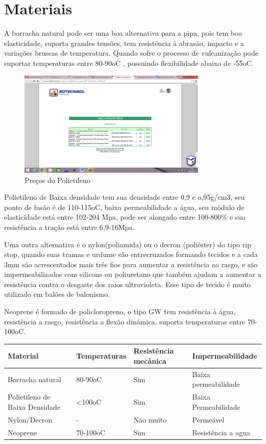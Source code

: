 \section{Materiais}

A borracha natural pode ser uma boa alternativa para a pipa, pois tem boa elasticidade, suporta grandes tensões, tem  resistência à abrasão, impacto e a variações bruscas de temperatura. Quando sofre o processo de vulcanização pode suportar temperaturas entre 80-90oC , possuindo flexibilidade abaixo de -55oC.

\begin{figure}[p]
    \includegraphics[width=0.8\textwidth]{figuras/preco-polietileno.png}
    \caption{Preços do Polietileno}
    \label{fig:polietileno}
\end{figure} 

Polietileno de Baixa densidade tem sua densidade entre 0,9 e o,95g/cm3, seu ponto de fusão é de 110-115oC, baixa permeabilidade a água, seu módulo de elasticidade está entre 102-204 Mpa, pode ser alongado entre 100-800\% e sua resistência a tração está entre 6,9-16Mpa.

Uma outra alternativa é o nylon(poliamida) ou o decron (poliéster) do tipo rip stop, quando suas tramas e urdume são entrecruzados formando tecidos e a cada 3mm são acrescentados mais três fios para aumentar a resistência ao rasgo, e são impermeabilizados com silicone ou poliuretano que também ajudam a aumentar a resistência contra o desgaste dos raios ultravioleta. Esse tipo de tecido é muito utilizado em balões de balonismo.

Neoprene é formado de policloropreno, o tipo GW tem resistência à água, resistência a rasgo, resistência a flexão dinâmica, suporta temperaturas entre 70-100oC.

\begin{center}
	\begin{tabular}{| l | l | l | l |}
		Material	&	Temperaturas	&	Resistência mecânica	&	Impermeabilidade	\\ \hline
		Borracha natural	&	80-90oC	&	Sim	&	Baixa permeabilidade	\\ \hline
		Polietileno de Baixa Densidade	&	<100oC	&	Sim	&	Baixa Permeabilidade	\\ \hline
		Nylon/Decron	&	-	&	Não muito	&	Permeável	\\ \hline
		Neoprene	&	70-100oC	&	Sim	&	Resistência a agua	\\ \hline
	\end{tabular}
\end{center}

